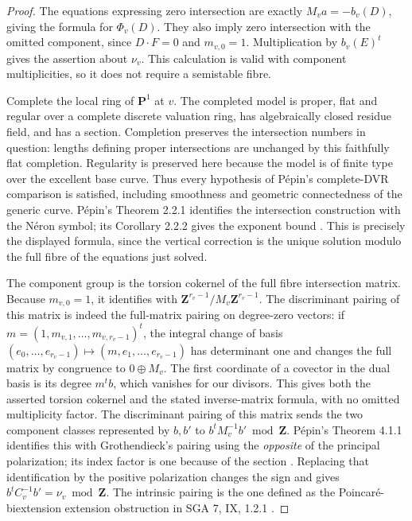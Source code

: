 \begin{proof}
The equations expressing zero intersection are exactly
$M_v a=-b_v(D)$, giving the formula for $\Phi_v(D)$.
They also imply zero intersection with the omitted component, since
$D\cdot F=0$ and $m_{v,0}=1$.  Multiplication by $b_v(E)^t$ gives the
assertion about $\nu_v$.  This calculation is valid with component
multiplicities, so it does not require a semistable fibre.

Complete the local ring of $\mathbf P^1$ at $v$.  The completed model
is proper, flat and regular over a complete discrete valuation ring,
has algebraically closed residue field, and has a section.  Completion
preserves the intersection numbers in question: lengths defining proper
intersections are unchanged by this faithfully flat completion.  Regularity
is preserved here because the model is of finite type over the excellent
base curve.  Thus every hypothesis of P\'epin's complete-DVR comparison is
satisfied, including smoothness and geometric connectedness of the generic
curve.  P\'epin's
Theorem 2.2.1 identifies the intersection construction with the N\'eron
symbol; its Corollary 2.2.2 gives the exponent bound
\cite[pp.~1323--1324]{Pepin2012}.  This is precisely the displayed
formula, since the vertical correction is the unique solution modulo
the full fibre of the equations just solved.

The component group is the torsion cokernel of the full fibre
intersection matrix.  Because $m_{v,0}=1$, it identifies with
$\mathbf Z^{r_v-1}/M_v\mathbf Z^{r_v-1}$.  The discriminant pairing of
this matrix is indeed the full-matrix pairing on degree-zero vectors:
if $m=(1,m_{v,1},\ldots,m_{v,r_v-1})^t$, the integral change of basis
$(e_0,\ldots,e_{r_v-1})\mapsto(m,e_1,\ldots,e_{r_v-1})$ has determinant
one and changes the full matrix by congruence to $0\oplus M_v$.
The first coordinate of a covector in the dual basis is its degree
$m^tb$, which vanishes for our divisors.  This gives both the asserted
torsion cokernel and the stated inverse-matrix formula, with no omitted
multiplicity factor.  The discriminant pairing of
this matrix sends the two component classes represented by $b,b'$ to
$b^tM_v^{-1}b'\bmod\mathbf Z$.  P\'epin's Theorem 4.1.1 identifies this
with Grothendieck's pairing using the \emph{opposite} of the principal
polarization; its index factor is one because of the section
\cite[pp.~1341--1343]{Pepin2012}.  Replacing that identification by the
positive polarization changes the sign and gives
$b^tC_v^{-1}b'=\nu_v\bmod\mathbf Z$.
The intrinsic pairing is the one defined as the Poincar\'e-biextension
extension obstruction in SGA 7, IX, 1.2.1 \cite{SGA7Pairing}.
\end{proof}

